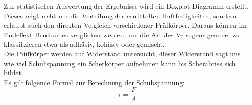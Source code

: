 Zur statistischen Auswertung der Ergebnisse wird ein Boxplot-Diagramm erstellt. Dieses zeigt nicht nur die Verteilung der ermittelten Haftfestigkeiten, sondern erlaubt auch den direkten Vergleich verschiedener Prüfkörper. Daraus können im Endeffekt Brucharten verglichen werden, um die Art des Versagens genauer zu klassifizieren etwa als adhäsiv, kohäsiv oder gemischt.\\
Die Prüfkörper werden auf Widerstand untersucht, dieser Widerstand sagt uns wie viel Schubspannung ein Scherkörper aufnehmen kann bis Scherabriss sich bildet.\\
Es gilt folgende Formel zur Berechnung der Schubspannung:\\
\begin{equation}
    \tau = \frac{F}{A}
\end{equation}   
\vspace{0.2cm}
